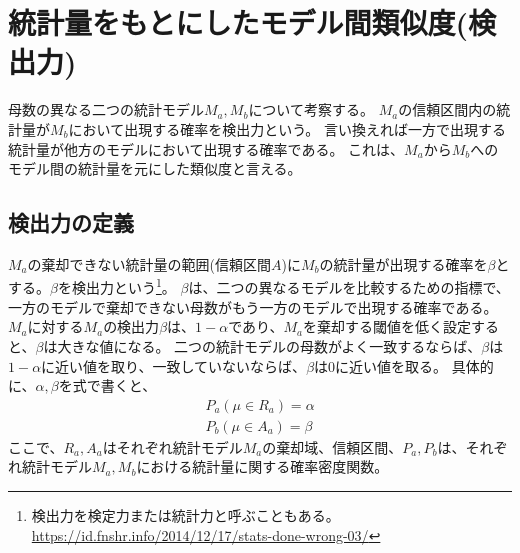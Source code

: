 \section{統計量をもとにしたモデル間類似度(検出力)}
母数の異なる二つの統計モデル$M_a,M_b$について考察する。
$M_a$の信頼区間内の統計量が$M_b$において出現する確率を検出力という。
言い換えれば一方で出現する統計量が他方のモデルにおいて出現する確率である。
これは、$M_a$から$M_b$へのモデル間の統計量を元にした類似度と言える。

\subsection{検出力の定義}
$M_a$の棄却できない統計量の範囲(信頼区間$A$)に$M_b$の統計量が出現する確率を$\beta$とする。$\beta$を検出力という\footnote{検出力を検定力または統計力と呼ぶこともある。\\ \url{https://id.fnshr.info/2014/12/17/stats-done-wrong-03/}}。
$\beta$は、二つの異なるモデルを比較するための指標で、一方のモデルで棄却できない母数がもう一方のモデルで出現する確率である。
$M_a$に対する$M_a$の検出力$\beta$は、$1-\alpha$であり、$M_a$を棄却する閾値を低く設定すると、$\beta$は大きな値になる。
二つの統計モデルの母数がよく一致するならば、$\beta$は$1-\alpha$に近い値を取り、一致していないならば、$\beta$は0に近い値を取る。
具体的に、$\alpha,\beta$を式で書くと、
\begin{eqnarray*}
    P_a(\mu \in R_a) = \alpha\\
    P_b(\mu \in A_a) = \beta
\end{eqnarray*}
ここで、$R_a,A_a$はそれぞれ統計モデル$M_a$の棄却域、信頼区間、$P_a,P_b$は、それぞれ統計モデル$M_a,M_b$における統計量に関する確率密度関数。

